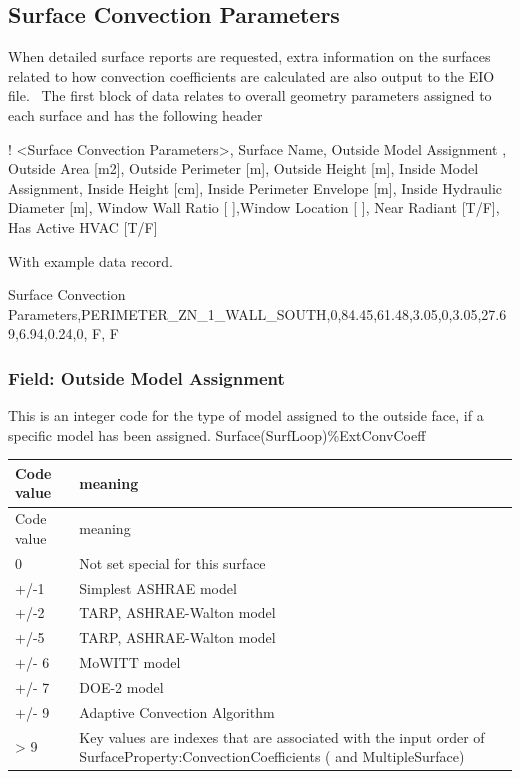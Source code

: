 \subsection{Surface Convection Parameters}\label{surface-convection-parameters}

When detailed surface reports are requested, extra information on the surfaces related to how convection coefficients are calculated are also output to the EIO file.~ The first block of data relates to overall geometry parameters assigned to each surface and has the following header

! \textless{}Surface Convection Parameters\textgreater{}, Surface Name, Outside Model Assignment , Outside Area {[}m2{]}, Outside Perimeter {[}m{]}, Outside Height {[}m{]}, Inside Model Assignment, Inside Height {[}cm{]}, Inside Perimeter Envelope {[}m{]}, Inside Hydraulic Diameter {[}m{]}, Window Wall Ratio {[} {]},Window Location {[} {]}, Near Radiant {[}T/F{]}, Has Active HVAC {[}T/F{]}

With example data record.

Surface Convection Parameters,PERIMETER\_ZN\_1\_WALL\_SOUTH,0,84.45,61.48,3.05,0,3.05,27.69,6.94,0.24,0, F, F

\subsubsection{Field: Outside Model Assignment}\label{field-outside-model-assignment}

This is an integer code for the type of model assigned to the outside face, if a specific model has been assigned. Surface(SurfLoop)\%ExtConvCoeff

\begin{longtable}[c]{p{1.5in}p{4.5in}}
\toprule 
Code value & meaning \tabularnewline
\midrule
\endfirsthead

\toprule 
Code value & meaning \tabularnewline
\midrule
\endhead

0 & Not set special for this surface \tabularnewline
+/-1 & Simplest ASHRAE model \tabularnewline
+/-2 & TARP, ASHRAE-Walton model \tabularnewline
+/-5 & TARP, ASHRAE-Walton model \tabularnewline
+/- 6 & MoWITT model \tabularnewline
+/- 7 & DOE-2 model \tabularnewline
+/- 9 & Adaptive Convection Algorithm \tabularnewline
> 9 & Key values are indexes that are associated with the input order of SurfaceProperty:ConvectionCoefficients ( and MultipleSurface) \tabularnewline
\bottomrule
\end{longtable}

